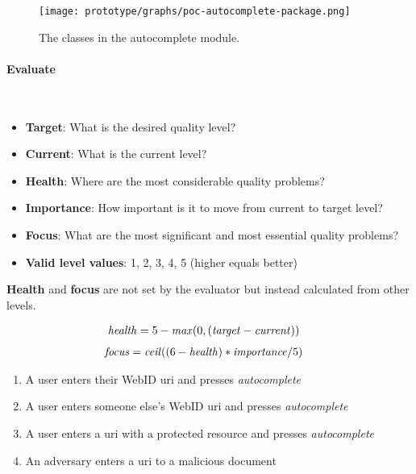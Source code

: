 \begin{figure}[H]
    \centering
    \texttt{[image: prototype/graphs/poc-autocomplete-package.png]}
    \caption{The classes in the autocomplete module.}
    \label{fig:poc-autocomplete-package}
\end{figure}
\vspace{0.5cm}
\paragraph{Evaluate}\mbox{}\\

\begin{itemize}
    \item \textbf{Target}: What is the desired quality level?
    \item \textbf{Current}: What is the current level?
    \item \textbf{Health}: Where are the most considerable quality problems?
    \item \textbf{Importance}: How important is it to move from current to target level?
    \item \textbf{Focus}: What are the most significant and most essential quality problems?
    \item \textbf{Valid level values}: 1, 2, 3, 4, 5 (higher equals better)
\end{itemize}

\textbf{Health} and \textbf{focus} are not set by the evaluator but instead calculated from other levels.

\begin{align*}
    \text{\textit{health}}&=5 - \text{\textit{max}}(0, (\text{\textit{target}} - \text{\textit{current}}))
\end{align*}
\vspace{-5mm}
\begin{align*}
    \text{\textit{focus}}&= \text{\textit{ceil}}((6 - \text{\textit{health}}) * \text{\textit{importance}}/5)
\end{align*}

\begin{enumerate}
    \item A user enters their WebID \gls{uri} and presses \textit{autocomplete}
    \item A user enters someone else's WebID \gls{uri} and presses \textit{autocomplete}
    \item A user enters a \gls{uri} with a protected resource and presses \textit{autocomplete}
    \item An adversary enters a \gls{uri} to a malicious document
\end{enumerate}

